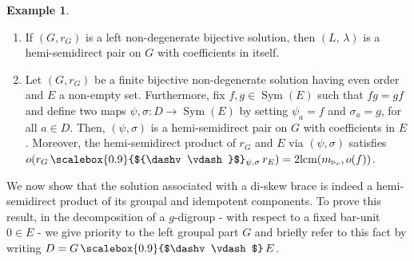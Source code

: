 \documentclass[preprint,1p]{elsarticle}
\numberwithin{equation}{section}
\theoremstyle{definition}               %
\newtheorem{ex}[theor]{Example}
\newcommand{\vd}{\vdash}
\newcommand{\dv}{\dashv}
\newcommand{\tr}{\triangleright}
\DeclareMathOperator{\Sym}{Sym}
\begin{document}
\smallskip

\begin{ex}\,
    \begin{enumerate}
        \item[1)] If $(G,r_G)$ is a left non-degenerate bijective solution, then $(L,\,\lambda)$ is a hemi-semidirect pair on $G$ with coefficients in itself.
        \item[2)] Let $(G,r_G)$ be a finite bijective non-degenerate solution having even order and $E$ a non-empty set.
        Furthermore, fix $f,g \in \Sym(E)$ such that $fg = gf$ and define two maps $\psi,\sigma:D \to \Sym(E)$ by setting $\psi_a = f$ and $\sigma_a = g$, for all $a \in D$.
        Then, $(\psi,\sigma)$ is a hemi-semidirect pair on $G$ with coefficients in $E$.
        Moreover, the hemi-semidirect product of $r_G$ and $E$ via $(\psi,\sigma)$ satisfies $o(r_G \, \text{\scalebox{0.9}{${\dv\vd}$}$_{\psi,\sigma}$}\, r_E) = 2 \textnormal{lcm}(m_{\tr_r},o(f))$.
    \end{enumerate}
\end{ex}

\smallskip

We now show that the solution associated with a di-skew brace is indeed a hemi-semidirect product of its groupal and idempotent components. 
To prove this result, in the decomposition of a $g$-digroup - with respect to a fixed bar-unit $0 \in E$ - we give priority to the left groupal part $G$ and briefly refer to this fact by writing $D = G \,\text{\scalebox{0.9}{$\dv\vd$}}\, E$.
\end{document}
